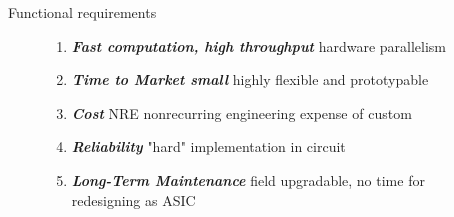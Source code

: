 \documentclass[t,12pt,english
\ifx\beamermode\undefined\else,\beamermode\fi
]{beamer}
\begin{document}
\begin{frame}{Functional requirements}

\begin{figure}[!htb]
\begin{block}{\footnotesize{}}\tiny{}
\begin{enumerate} 
\vspace{0.05cm}
     \item \tiny{\textbf{\textit{Fast computation, high throughput}}} \tiny{hardware parallelism}
     \item \tiny{\textbf{\textit{Time to Market small}}} \tiny{highly flexible and prototypable} 
     \item \tiny{\textbf{\textit{Cost}}} \tiny{NRE nonrecurring engineering expense of custom}
     \item \tiny{\textbf{\textit{Reliability}}} \tiny{"hard" implementation in circuit}
     \item \tiny{\textbf{\textit{Long-Term Maintenance}}} \tiny{field upgradable, no time for redesigning as ASIC}
\end{enumerate}
\end{block}


\end{figure}
\end{frame}
\end{document}
